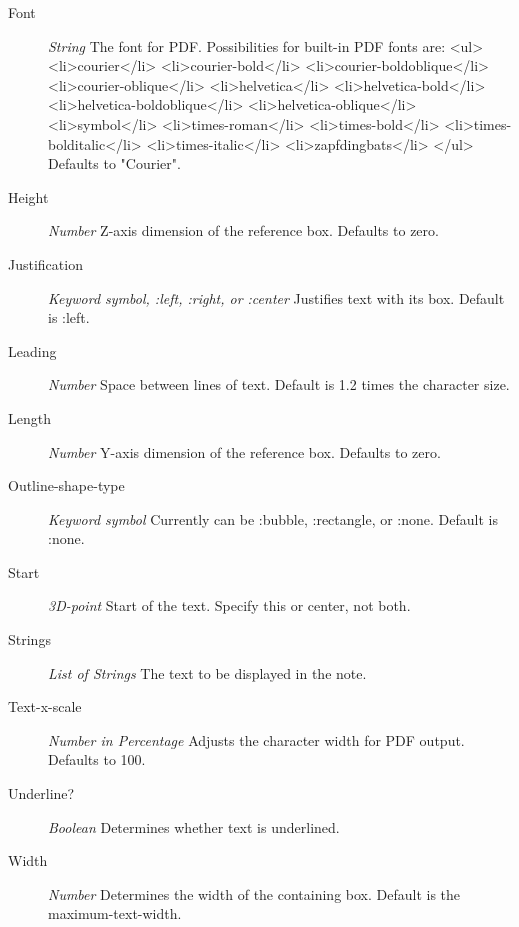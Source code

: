 \documentclass [11pt]{book}
\begin{document}
\begin{itemize}
\begin{description}
\item [Font]
\emph{String} The font for PDF. Possibilities for built-in PDF fonts are:
<ul>
<li>courier</li>
<li>courier-bold</li>
<li>courier-boldoblique</li>
<li>courier-oblique</li>
<li>helvetica</li>
<li>helvetica-bold</li>
<li>helvetica-boldoblique</li>
<li>helvetica-oblique</li>
<li>symbol</li>
<li>times-roman</li>
<li>times-bold</li>
<li>times-bolditalic</li>
<li>times-italic</li>
<li>zapfdingbats</li>
</ul>
Defaults to "Courier".


\item [Height]
\emph{Number} Z-axis dimension of the reference box. Defaults to zero.


\item [Justification]
\emph{Keyword symbol, :left, :right, or :center} Justifies text with its box. Default is :left.


\item [Leading]
\emph{Number} Space between lines of text. Default is 1.2 times the character size.


\item [Length]
\emph{Number} Y-axis dimension of the reference box. Defaults to zero.


\item [Outline-shape-type]
\emph{Keyword symbol} Currently can be :bubble, :rectangle, or :none. Default is :none.


\item [Start]
\emph{3D-point} Start of the text. Specify this or center, not both.


\item [Strings]
\emph{List of Strings} The text to be displayed in the note.


\item [Text-x-scale]
\emph{Number in Percentage} Adjusts the character width for PDF output. Defaults to 100.


\item [Underline?]
\emph{Boolean} Determines whether text is underlined.


\item [Width]
\emph{Number} Determines the width of the containing box. Default is the maximum-text-width.



\end{description}
\end{itemize}
\end{document}

